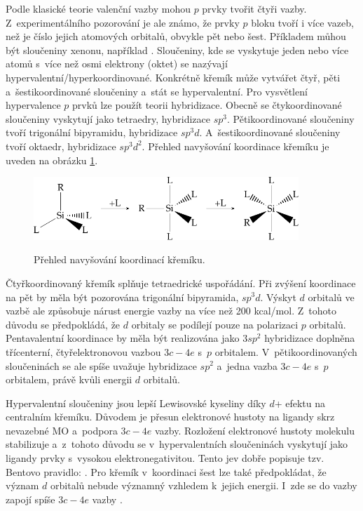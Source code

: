 \documentclass[
digital, %
table,   %
lof,     %
lot,     %
oneside,
]{fithesis3}
\begin{document}
Podle klasické teorie valenční vazby mohou $p$ prvky tvořit čtyři vazby. Z~experimentálního pozorování je ale známo, že prvky $p$ bloku tvoří i více vazeb, než je číslo jejich atomových orbitalů, obvykle pět nebo šest. Příkladem můhou být sloučeniny xenonu, například .
Sloučeniny, kde se vyskytuje jeden nebo více atomů s~více než osmi elektrony (oktet) se nazývají hypervalentní/hyperkoordinované. Konkrétně křemík může vytvářet čtyř, pěti a~šestikoordinované sloučeniny a~stát se hypervalentní. Pro vysvětlení hypervalence $p$ prvků lze použít teorii hybridizace. Obecně se čtykoordinované sloučeniny vyskytují jako tetraedry, hybridizace $sp^3$. Pětikoordinované sloučeniny tvoří trigonální bipyramidu, hybridizace $sp^3d$. A~šestikoordinované sloučeniny tvoří oktaedr, hybridizace $sp^3d^2$. Přehled navyšování koordinace křemíku je uveden na obrázku \ref{prehled_koordinaci}.

\begin{figure}
\caption{Přehled navyšování koordinací křemíku.}
\center \includegraphics[width=10cm]{drawing.pdf} \label{prehled_koordinaci} \end{figure}

Čtyřkoordinovaný křemík splňuje tetraedrické uspořádání. Při zvýšení koordinace na pět by měla být pozorována trigonální bipyramida, $sp^3d$. Výskyt $d$ orbitalů ve vazbě ale způsobuje nárust energie vazby na více než 200 kcal/mol. Z~tohoto důvodu se předpokládá, že $d$ orbitaly se podílejí pouze na polarizaci $p$ orbitalů. Pentavalentní koordinace by měla být realizována jako $3sp^2$ hybridizace doplněna třícenterní, čtyřelektronovou vazbou $3c-4e$ s~$p$ orbitalem. V~pětikoordinovaných sloučeninách se ale spíše uvažuje hybridizace $sp^2$ a~jedna vazba $3c-4e$ s~$p$ orbitalem, právě kvůli energii $d$ orbitalů.

Hypervalentní sloučeniny jsou lepší Lewisovské kyseliny díky $d$+ efektu na centralním křemíku. Důvodem je přesun elektronové hustoty na ligandy skrz nevazebné MO a~podpora $3c-4e$ vazby. Rozložení elektronové hustoty molekulu stabilizuje a~z~tohoto důvodu se v~hypervalentních sloučeninách vyskytují jako ligandy prvky s~vysokou elektronegativitou. Tento jev dobře popisuje tzv. Bentovo pravidlo: \cite{hypervalentsiliconmacmillangroup2005}. Pro křemík v~koordinaci šest lze také předpokládat, že význam $d$ orbitalů nebude významný vzhledem k~jejich energii. I~zde se do vazby zapojí spíše $3c-4e$ vazby \cite{Wagler2014}.
\end{document}

